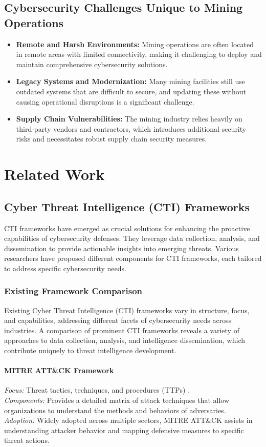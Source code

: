\documentclass[a4paper,twoside,12pt]{report}
\begin{document}
\subsection*{Cybersecurity Challenges Unique to Mining Operations}
\begin{itemize}
    \item \textbf{Remote and Harsh Environments:} Mining operations are often located in remote areas with limited connectivity, making it challenging to deploy and maintain comprehensive cybersecurity solutions.
    \item \textbf{Legacy Systems and Modernization:} Many mining facilities still use outdated systems that are difficult to secure, and updating these without causing operational disruptions is a significant challenge.
    \item \textbf{Supply Chain Vulnerabilities:} The mining industry relies heavily on third-party vendors and contractors, which introduces additional security risks and necessitates robust supply chain security measures.
\end{itemize}

\section{Related Work}
\subsection{Cyber Threat Intelligence (CTI) Frameworks}
CTI frameworks have emerged as crucial solutions for enhancing the proactive capabilities of cybersecurity defenses. They leverage data collection, analysis, and dissemination to provide actionable insights into emerging threats. Various researchers have proposed different components for CTI frameworks, each tailored to address specific cybersecurity needs.


\subsubsection*{Existing Framework Comparison}
Existing Cyber Threat Intelligence (CTI) frameworks vary in structure, focus, and capabilities, addressing different facets of cybersecurity needs across industries. A comparison of prominent CTI frameworks reveals a variety of approaches to data collection, analysis, and intelligence dissemination, which contribute uniquely to threat intelligence development.

\paragraph{MITRE ATT\&CK Framework \citet{georgiadou2021assessing}}
\textit{Focus:} Threat tactics, techniques, and procedures (TTPs) \citet{shahi2018tactics}. \\
\textit{Components:} Provides a detailed matrix of attack techniques that allow organizations to understand the methods and behaviors of adversaries. \\
\textit{Adoption:} Widely adopted across multiple sectors, MITRE ATT\&CK assists in understanding attacker behavior and mapping defensive measures to specific threat actions.
\end{document}
